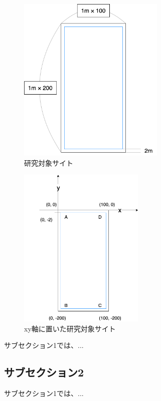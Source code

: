 \documentclass[12pt]{jsarticle}
\begin{document}
  \begin{figure}[H]
    \begin{center}
      \includegraphics[width=7cm]{images/site_map.png}
    \end{center}
    \caption{研究対象サイト}
    \label{fig:site_map}
  \end{figure}

  \begin{figure}[H]
    \begin{center}
      \includegraphics[width=6cm]{images/site_map_x_y.png}
    \end{center}
    \caption{xy軸に置いた研究対象サイト}
    \label{fig:site_map_x_y}
  \end{figure}

  サブセクション1では、...
  
  \subsection{サブセクション2}

  サブセクション1では、...
\end{document}
